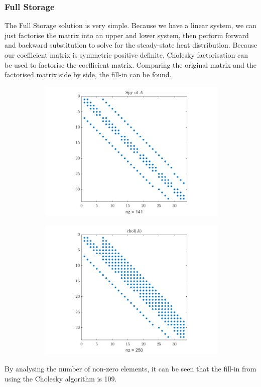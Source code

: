 \documentclass[12pt,a4paper]{article}
\begin{document}
\subsubsection{Full Storage}
The Full Storage solution is very simple. Because we have a linear system, we can just factorise the matrix into an upper and lower system, then perform forward and backward substitution to solve for the steady-state heat distribution. Because our coefficient matrix is symmetric positive definite, Cholesky factorisation can be used to factorise the coefficient matrix. Comparing the original matrix and the factorised matrix side by side, the fill-in can be found.
\begin{figure}[H]
	\hspace{-8mm}
	\begin{subfigure}[b]{0.6\textwidth}
		\hspace{-8mm}
		\includegraphics[width=\textwidth]{images/spyA.png}
	\end{subfigure}
	\hspace{-8mm}
	\begin{subfigure}[b]{0.6\textwidth}
		\hspace{-8mm}
		\includegraphics[width=\textwidth]{images/cholA.png}
	\end{subfigure}
\end{figure}
By analysing the number of non-zero elements, it can be seen that the fill-in from using the Cholesky algorithm is 109.
\end{document}
